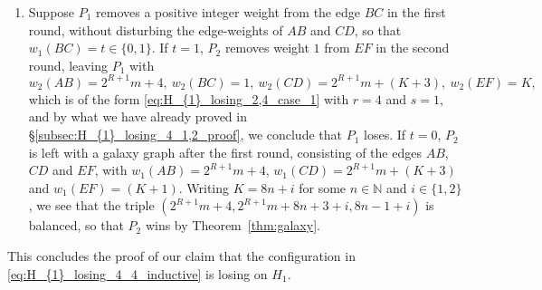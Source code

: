 \documentclass[11pt,reqno]{amsart}
\theoremstyle{definition}
\theoremstyle{definition}
\begin{document}
\begin{enumerate}
\item Suppose $P_{1}$ removes a positive integer weight from the edge $BC$ in the first round, without disturbing the edge-weights of $AB$ and $CD$, so that $w_{1}(BC)=t \in \{0,1\}$. If $t=1$, $P_{2}$ removes weight $1$ from $EF$ in the second round, leaving $P_{1}$ with
\begin{equation}
w_{2}(AB)=2^{R+1}m+4,\ w_{2}(BC)=1,\ w_{2}(CD)=2^{R+1}m+(K+3),\ w_{2}(EF)=K,\nonumber
\end{equation}
which is of the form \eqref{eq:H_{1}_losing_2,4_case_1} with $r=4$ and $s=1$, and by what we have already proved in \S\ref{subsec:H_{1}_losing_4_1,2_proof}, we conclude that $P_{1}$ loses. If $t=0$, $P_{2}$ is left with a galaxy graph after the first round, consisting of the edges $AB$, $CD$ and $EF$, with $w_{1}(AB)=2^{R+1}m+4$, $w_{1}(CD)=2^{R+1}m+(K+3)$ and $w_{1}(EF)=(K+1)$. Writing $K=8n+i$ for some $n\in\mathbb{N}$ and $i\in\{1,2\}$, we see that the triple $\left(2^{R+1}m+4,2^{R+1}m+8n+3+i,8n-1+i\right)$ is balanced, so that $P_{2}$ wins by Theorem~\ref{thm:galaxy}.
\end{enumerate}
This concludes the proof of our claim that the configuration in \eqref{eq:H_{1}_losing_4_4_inductive} is losing on $H_{1}$. 
\end{document}
